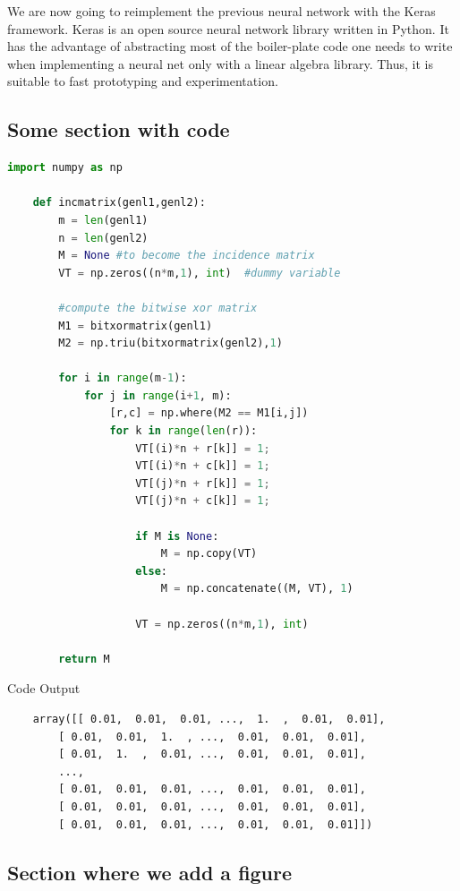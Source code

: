 
We are now going to reimplement the previous neural network with the Keras framework. Keras is an open source neural network library written in Python. It has the advantage of abstracting most of the boiler-plate code one needs to write when implementing a neural net only with a linear algebra library. Thus, it is suitable to fast prototyping and experimentation.

\subsection{Some section with code}

\begin{lstlisting}[language=Python]
    import numpy as np
     
    def incmatrix(genl1,genl2):
        m = len(genl1)
        n = len(genl2)
        M = None #to become the incidence matrix
        VT = np.zeros((n*m,1), int)  #dummy variable
     
        #compute the bitwise xor matrix
        M1 = bitxormatrix(genl1)
        M2 = np.triu(bitxormatrix(genl2),1) 
     
        for i in range(m-1):
            for j in range(i+1, m):
                [r,c] = np.where(M2 == M1[i,j])
                for k in range(len(r)):
                    VT[(i)*n + r[k]] = 1;
                    VT[(i)*n + c[k]] = 1;
                    VT[(j)*n + r[k]] = 1;
                    VT[(j)*n + c[k]] = 1;
     
                    if M is None:
                        M = np.copy(VT)
                    else:
                        M = np.concatenate((M, VT), 1)
     
                    VT = np.zeros((n*m,1), int)
     
        return M
\end{lstlisting}

Code Output

\begin{lstlisting}
    array([[ 0.01,  0.01,  0.01, ...,  1.  ,  0.01,  0.01],
        [ 0.01,  0.01,  1.  , ...,  0.01,  0.01,  0.01],
        [ 0.01,  1.  ,  0.01, ...,  0.01,  0.01,  0.01],
        ..., 
        [ 0.01,  0.01,  0.01, ...,  0.01,  0.01,  0.01],
        [ 0.01,  0.01,  0.01, ...,  0.01,  0.01,  0.01],
        [ 0.01,  0.01,  0.01, ...,  0.01,  0.01,  0.01]])
\end{lstlisting}

\subsection{Section where we add a figure}

